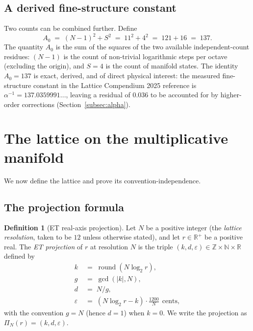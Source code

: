 \documentclass[11pt,a4paper]{article}
\theoremstyle{definition}
\newtheorem{definition}[theorem]{Definition}
\theoremstyle{remark}
\newcommand{\R}{\mathbb{R}}
\newcommand{\Z}{\mathbb{Z}}
\newcommand{\N}{\mathbb{N}}
\DeclareMathOperator{\round}{round}
\newcommand{\eps}{\varepsilon}
\begin{document}
\subsection{A derived fine-structure constant}

Two counts can be combined further. Define
\begin{equation}\label{eq:A0}
A_{0} \;=\; (N-1)^{2} + S^{2} \;=\; 11^{2} + 4^{2} \;=\; 121 + 16 \;=\; 137.
\end{equation}
The quantity $A_{0}$ is the sum of the squares of the two available independent-count residues: $(N-1)$ is the count of non-trivial logarithmic steps per octave (excluding the origin), and $S=4$ is the count of manifold states. The identity $A_{0}=137$ is exact, derived, and of direct physical interest: the measured fine-structure constant in the Lattice Compendium 2025 reference is $\alpha^{-1}=137.0359991...$, leaving a residual of $0.036$ to be accounted for by higher-order corrections (Section~\ref{subsec:alpha}).

\section{The lattice on the multiplicative manifold}\label{sec:lattice}

We now define the lattice and prove its convention-independence.

\subsection{The projection formula}

\begin{definition}[ET real-axis projection]\label{def:projection}
Let $N$ be a positive integer (the \emph{lattice resolution}, taken to be $12$ unless otherwise stated), and let $r\in\R^{+}$ be a positive real. The \emph{ET projection} of $r$ at resolution $N$ is the triple $(k,d,\eps)\in\Z\times\N\times\R$ defined by
\begin{align}
k &\;=\; \round(N\log_{2}r),\label{eq:k}\\
g &\;=\; \gcd(|k|,N),\\
d &\;=\; N/g,\label{eq:d}\\
\eps &\;=\; (N\log_{2}r - k)\cdot\frac{1200}{N}\ \ \text{cents},\label{eq:eps}
\end{align}
with the convention $g=N$ (hence $d=1$) when $k=0$. We write the projection as $\Pi_{N}(r) = (k,d,\eps)$.
\end{definition}
\end{document}

